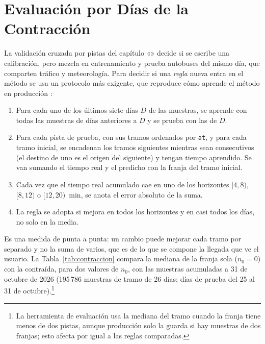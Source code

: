 \section{Evaluación por Días de la Contracción}
\label{sec:eval-contraccion}

La validación cruzada por pistas del capítulo «» decide si se escribe una calibración, pero mezcla
en entrenamiento y prueba autobuses del mismo día, que comparten tráfico y meteorología. Para decidir si una
\emph{regla} nueva entra en el método se usa un protocolo más exigente, que reproduce cómo aprende el método en producción
\citep{hyndman2021}:

\begin{enumerate}
  \item Para cada uno de los últimos siete días $D$ de las muestras, se aprende con todas las muestras de días
        anteriores a $D$ y se prueba con las de $D$.
  \item Para cada pista de prueba, con sus tramos ordenados por \texttt{at}, y para cada tramo inicial, se encadenan los tramos
        siguientes mientras sean consecutivos (el destino de uno es el origen del siguiente) y tengan tiempo
        aprendido. Se van sumando el tiempo real y el predicho con la franja del tramo inicial.
  \item Cada vez que el tiempo real acumulado cae en uno de los horizontes $[4,8)$, $[8,12)$ o $[12,20)$~min, se anota
        el error absoluto de la suma.
  \item La regla se adopta si mejora en todos los horizontes y en casi todos los días, no solo en la media.
\end{enumerate}

\noindent Es una medida de punta a punta: un cambio puede mejorar cada tramo por separado y no la suma de varios, que
es de lo que se compone la llegada que ve el usuario. La Tabla~\ref{tab:contraccion} compara la mediana de la franja sola ($n_0=0$) con la
contraída, para dos valores de $n_0$, con las muestras acumuladas a 31 de octubre de 2026 (195\,786 muestras de tramo de 26 días;
días de prueba del 25 al 31 de octubre).\footnote{La herramienta de evaluación usa la mediana del tramo cuando la
franja tiene menos de dos pistas, aunque producción solo la guarda si hay muestras de dos franjas; esto afecta por igual
a las reglas comparadas.}

